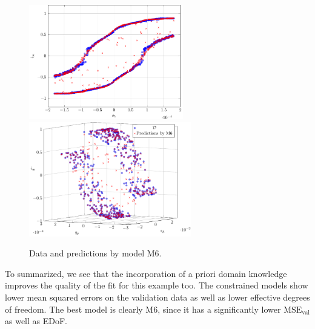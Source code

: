 \begin{figure}[H]
	\centering 
	\includegraphics[height=5cm]{graphics/pgfplots/cha6/M6_2d.pdf}\quad
	\includegraphics[height=5cm]{graphics/pgfplots/cha6/M6_3d.pdf}
	\caption{Data and predictions by model M6.}
	\label{fig:bosch-M6}
\end{figure}

To summarized, we see that the incorporation of a priori domain knowledge improves the quality of the fit for this example too. The constrained models show lower mean squared errors on the validation data as well as lower effective degrees of freedom. The best model is clearly M6, since it has a significantly lower $\text{MSE}_{\text{val}}$ as well as EDoF. 